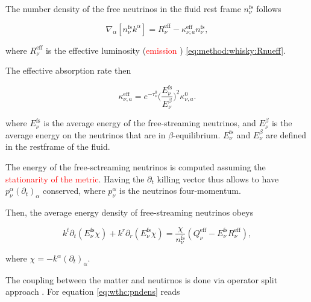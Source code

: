 \documentclass[11pt,a4paper,headinclude=true,DIV=14,BCOR=8mm,chapterprefix,listof=totoc,twoside,openright,abstracton]{scrbook}
\newcommand{\red}[1]{\textcolor{red}{#1}}
\begin{document}
The number density of the free neutrinos in the fluid rest frame $n_{\nu}^{\text{fs}}$ follows \cite{Radice:2016dwd}

\begin{equation}
    \label{eq:method:whisky:eq7}
    \nabla_{\alpha}[n_{\nu}^{\text{fs}}k^{\alpha}] = R_{\nu}^{\text{eff}} - \kappa_{\nu;a}^{\text{eff}}n_{\nu}^{\text{fs}},
\end{equation}

where $R_{\nu}^{\text{eff}}$ is the effective luminosity (\red{emission }) \eqref{eq:method:whisky:Rnueff}. 

The effective absorption rate then

\begin{equation}
    \kappa_{\nu,a}^{\text{eff}} = e^{-\tau_{\nu}^0}\Big( \frac{E_{\nu}^{\text{fs}}}{E_{\nu}^{\beta}} \Big)^2 \kappa_{\nu,a}^0.
\end{equation}

where $E_{\nu}^{\text{fs}}$ is the average energy of the free-streaming neutrinos, and 
$E_{\nu}^{\beta}$ is the average energy on the neutrinos that are in $\beta$-equilibrium.
$E_{\nu}^{\text{fs}}$ and $E_{\nu}^{\beta}$ are defined in the restframe of the fluid.

The energy of the free-sctreaming neutrinos is computed assuming the \red{stationarity of the metric}.
Having the $\partial_t$ killing vector thus allows to have $p_{\nu}^{\alpha}(\partial_t)_{\alpha}$ conserved, 
where $p_{\nu}^{\alpha}$ is the neutrinos four-momentum.

Then, the average energy density of free-streaming neutrinos obeys

\begin{equation}
   \label{eq:method:whisky:eq9}
    k^t\partial_t(E_{\nu}^{\text{fs}}\chi) + k^{r}\partial_r(E_{\nu}^{\text{fs}}\chi) = \frac{\chi}{n_{\nu}^{\text{fs}}}(Q_{\nu}^{\text{eff}}-E_{\nu}^{\text{fs}}R_{\nu}^{\text{eff}}),
\end{equation}

where $\chi=-k^{\alpha}(\partial_t)_{\alpha}$.

The coupling between the matter and neutirnos is done via operator split approach \cite{Radice:2016dwd}.
For equation \eqref{eq:wthc:pndens} reads
\end{document}
